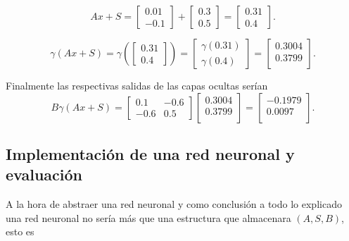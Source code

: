 \begin{equation}
    A x +S= 
    \begin{bmatrix}
        0.01  \\
        -0.1 
    \end{bmatrix}
    + 
    \begin{bmatrix}
        0.3  \\
        0.5 
    \end{bmatrix}
    = 
    \begin{bmatrix}
        0.31  \\
        0.4 
    \end{bmatrix}
    . 
\end{equation}

\begin{equation}
    \gamma (A x +S) = 
    \gamma \left(
    \begin{bmatrix}
        0.31  \\
        0.4 
    \end{bmatrix}
    \right)
    = 
    \begin{bmatrix}
        \gamma(0.31)  \\
        \gamma(0.4) 
    \end{bmatrix}
    = 
    \begin{bmatrix}
        0.3004 \\
        0.3799  \\
    \end{bmatrix}.
\end{equation}

Finalmente las respectivas salidas de las capas ocultas serían
\begin{equation}
    B  \gamma (A x +S)  
    = 
    \begin{bmatrix}
        0.1 & -0.6 \\
        -0.6 & 0.5
    \end{bmatrix}
    \begin{bmatrix}
        0.3004 \\
        0.3799  \\
    \end{bmatrix}
    = 
    \begin{bmatrix}
        -0.1979 \\
       0.0097  \\
    \end{bmatrix}.
\end{equation}

\newpage
\subsection{Implementación de una red neuronal y evaluación}
\label{section:rrnn_implementation}
A la hora de abstraer una red neuronal 
y como conclusión a todo lo explicado una red neuronal no 
sería más que una estructura que almacenara $(A, S, B)$, esto es 

